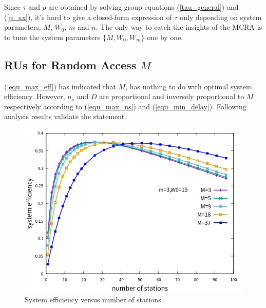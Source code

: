 \documentclass[journal]{IEEEtran}
\begin{document}

Since $\tau$ and $p$ are obtained by solving group equations (\ref{tau_general}) and (\ref{p_ax}), it's hard to give a closed-form expression of $\tau$ only depending on system parameters, $M$, $W_0$, $m$ and $n$.
The only way to catch the insights of the MCRA is to tune the system parameters $\lbrace M, W_0, W_m \rbrace$ one by one.

\subsection{RUs for Random Access $M$}
\label{M}
(\ref{equ_max_eff}) has indicated that $M$, has nothing to do with optimal system efficiency. 
However, $n_s$ and $D$ are proportional and inversely proportional to $M$ respectively according to (\ref{equ_max_ns}) and (\ref{equ_min_delay}). 
Following analysis results validate the statement. 


\begin{figure}[!h]
\centering
\includegraphics[scale=.54]{./figure/n_M_eff_perf.png}
\caption{System efficiency versus number of stations}
\label{fig_n_M_eff}
\end{figure}
\end{document}

